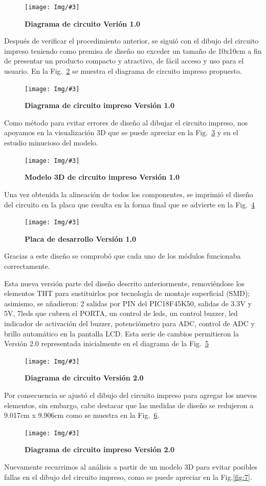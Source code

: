 \documentclass[times, 10pt,twocolumn]{article}
\newcommand{\Img}[5]{
   \begin{figure}[H]
   	   \centering
       \texttt{[image: Img/\#3]}
       \caption{ \centering \textbf{\small #4}}
       \label{#5}
       \end{figure}
   }
\begin{document}
\Img{8.5cm}{6.3cm}{Primera_Version.pdf}{Diagrama de circuito Verión 1.0}{fig:1} Después de verificar el procedimiento anterior, se siguió con el dibujo del circuito impreso teniendo como premisa de diseño no exceder un tamaño de 10x10cm a fin de presentar un producto compacto y atractivo, de fácil acceso y uso para el usuario.
En la Fig.~\ref{fig:2} se muestra el diagrama de circuito impreso propuesto.
\Img{6.5cm}{6.0cm}{primera_version_pcb}{Diagrama de circuito impreso Versión 1.0}{fig:2}
Como método para evitar errores de diseño al dibujar el circuito impreso, nos apoyamos en la visualización 3D que se puede apreciar en la Fig.~\ref{fig:3} y en el estudio minucioso del modelo.
\Img{8.5cm}{7.0cm}{primera_version_3d}{Modelo 3D de circuito impreso Versión 1.0}{fig:3}
Una vez obtenida la alineación de todos los componentes, se imprimió el diseño del circuito en la placa que resulta en la forma final que se advierte en la Fig.~\ref{fig:4}
\Img{8.5cm}{7.0cm}{primera_version_final}{Placa de desarrollo Versión 1.0}{fig:4} 
Gracias a este diseño se comprobó que cada uno de los módulos funcionaba correctamente. 


Esta nueva versión parte del diseño descrito anteriormente, removiéndose los elementos THT para sustituirlos por tecnología de montaje superficial (SMD); asimismo, se añadieron: 2 salidas por PIN del PIC18F45K50, salidas de 3.3V y 5V, 7leds que cubren el PORTA, un control de leds, un control buzzer, led indicador de activación del buzzer, potenciómetro para ADC, control de ADC y brillo automático en la pantalla LCD. Esta serie de cambios permitieron la Versión 2.0 representada inicialmente en el diagrama de la Fig.~\ref{fig:5}
\Img{8.0cm}{5.5cm}{Segunda_Version}{Diagrama de circuito Versión 2.0}{fig:5}

Por consecuencia se ajustó el dibujo del circuito impreso para agregar los nuevos elementos, sin embargo, cabe destacar que las medidas de diseño se redujeron a 9.017cm x 9.906cm como se muestra en la Fig.~\ref{fig:6}. 
\Img{6.5cm}{6.0cm}{segunda_version_pcb}{Diagrama de circuito impreso Versión 2.0}{fig:6}


Nuevamente recurrimos al análisis a partir de un modelo 3D para evitar posibles fallas en el dibujo del circuito impreso, como se puede apreciar en la Fig.\ref{fig:7}.
\end{document}
